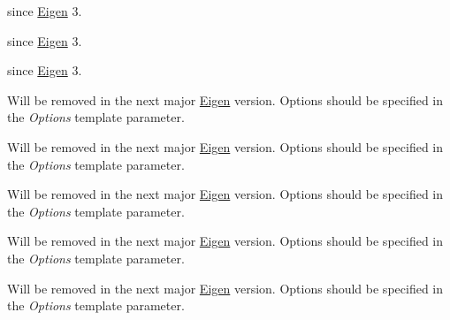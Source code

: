 \begin{DoxyRefList}
\label{deprecated__deprecated000398}%
%
since \mbox{\hyperlink{namespace_eigen}{Eigen}} 3.  
\item[Member \mbox{\hyperlink{class_eigen_1_1internal_1_1_upper_bidiagonalization_a1fc11f1a7c87ffaacf325d7a55b414ae}{Eigen::internal::Upper\+Bidiagonalization$<$ Matrix\+Type\+\_\+ $>$::Index}} ]\label{deprecated__deprecated000372}%
%
since \mbox{\hyperlink{namespace_eigen}{Eigen}} 3. 

\label{deprecated__deprecated000414}%
%
since \mbox{\hyperlink{namespace_eigen}{Eigen}} 3.  
\item[Member \mbox{\hyperlink{class_eigen_1_1_jacobi_s_v_d_a57429db9d8ef2c3f64616f8df25716e2}{Eigen::Jacobi\+S\+VD::compute}} (const Matrix\+Type \&matrix, unsigned int computation\+Options)]\label{deprecated__deprecated000370}%
%
Will be removed in the next major \mbox{\hyperlink{namespace_eigen}{Eigen}} version. Options should be specified in the {\itshape Options} template parameter. 

\label{deprecated__deprecated000412}%
%
Will be removed in the next major \mbox{\hyperlink{namespace_eigen}{Eigen}} version. Options should be specified in the {\itshape Options} template parameter.  
\item[Member \mbox{\hyperlink{class_eigen_1_1_jacobi_s_v_d_a57ba197221577d82a15df49df6840f49}{Eigen::Jacobi\+S\+VD::Jacobi\+S\+VD}} (Index rows, Index cols, unsigned int computation\+Options)]\label{deprecated__deprecated000368}%
%
Will be removed in the next major \mbox{\hyperlink{namespace_eigen}{Eigen}} version. Options should be specified in the {\itshape Options} template parameter. 

\label{deprecated__deprecated000410}%
%
Will be removed in the next major \mbox{\hyperlink{namespace_eigen}{Eigen}} version. Options should be specified in the {\itshape Options} template parameter.  
\item[Member \mbox{\hyperlink{class_eigen_1_1_jacobi_s_v_d_a8033577cc9576cc4e9680339679bf6ed}{Eigen::Jacobi\+S\+VD::Jacobi\+S\+VD}} (const Matrix\+Type \&matrix, unsigned int computation\+Options)]\label{deprecated__deprecated000369}%
%
Will be removed in the next major \mbox{\hyperlink{namespace_eigen}{Eigen}} version. Options should be specified in the {\itshape Options} template parameter. 


\end{DoxyRefList}
